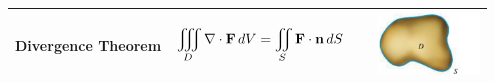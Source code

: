 \documentclass[../mathNotesPreamble]{subfiles}
\begin{document}
\begin{center}
\begin{tabular}{@{}m{0.32\linewidth}m{0.4\linewidth}m{0.23\linewidth}@{}}
      \textbf{Divergence Theorem}& $\displaystyle\iiint\limits_D \nabla\cdot\mathbf F\,dV=\iint\limits_S \mathbf F\cdot{\mathbf{n}}\,dS$& \includegraphics[width=\linewidth]{../images/briggs_17_08/tab17_04e}\\\bottomrule
    \end{tabular}
  \end{center}
  
\end{document}
